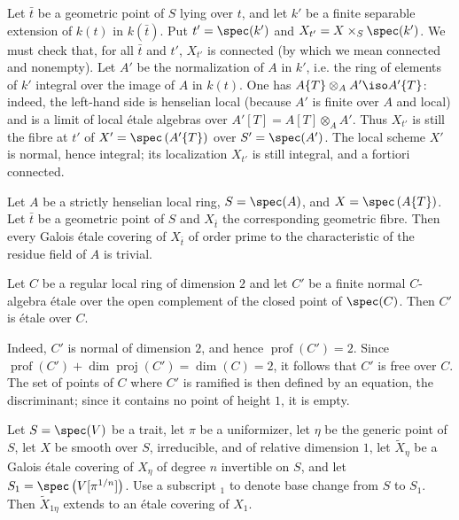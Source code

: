 Let $\bar t$ be a geometric point of $S$ lying over $t$, and let $k'$
be a finite separable extension of $k(t)$ in $k(\bar t)$. Put
$t'=\spec(k')$ and $X_{t'}=X\times_S\spec(k')$. We must check that, for
all $\bar t$ and $t'$, $X_{t'}$ is connected (by which we mean connected
and nonempty). Let $A'$ be the normalization of $A$ in $k'$, i.e. the
ring of elements of $k'$ integral over the image of $A$ in $k(t)$. One
has $A\{T\}\otimes_AA'\iso A'\{T\}$: indeed, the left-hand side is
henselian local (because $A'$ is finite over $A$ and local) and is a
limit of local étale algebras over
$A'[T]=A[T]\otimes_AA'$. Thus $X_{t'}$ is still the fibre at $t'$
of $X'=\spec\left(A'\{T\}\right)$ over $S'=\spec(A')$. The local scheme
$X'$ is normal, hence integral; its localization $X_{t'}$ is still
integral, and a fortiori connected.

\begin{proposition}\label{I:5-2-3}
Let $A$ be a strictly henselian local ring, $S=\spec(A)$, and
$X=\spec\left(A\{T\}\right)$. Let $\bar t$ be a geometric point of $S$
and $X_{\bar t}$ the corresponding geometric fibre. Then every Galois
étale covering of $X_{\bar t}$ of order prime to the characteristic of
the residue field of $A$ is trivial.
\end{proposition}

\begingroup
\renewcommand*{\thesubsubsection}{2.3.1}
\begin{lemma} \label{I:5-2-4} %
Let $C$ be a regular local ring of dimension $2$ and let $C'$ be a
finite normal $C$-algebra étale over the open complement of the closed
point of $\spec(C)$. Then $C'$ is étale over $C$.
\end{lemma}
\endgroup

Indeed, $C'$ is normal of dimension $2$, and hence
$\operatorname{prof}(C')=2$. Since
$\operatorname{prof}(C')+\dim\operatorname{proj}(C')=\dim(C)=2$, it
follows that $C'$ is free over $C$. The set of points of $C$ where $C'$
is ramified is then defined by an equation, the discriminant; since it
contains no point of height $1$, it is empty.

\begingroup
\renewcommand*{\thesubsubsection}{2.3.2}
\begin{lemma}\label{I:5-2-5} %
Let $S=\spec(V)$ be a trait, let $\pi$ be a uniformizer, let $\eta$ be
the generic point of $S$, let $X$ be smooth over $S$, irreducible, and
of relative dimension $1$, let $\widetilde X_\eta$ be a Galois étale
covering of $X_\eta$ of degree $n$ invertible on $S$, and let
$S_1=\spec\left(V[\pi^{1/n}]\right)$. Use a subscript ${}_1$ to denote
base change from $S$ to $S_1$. Then $\widetilde X_{1\eta}$ extends to an
étale covering of $X_1$.
\end{lemma}
\endgroup

